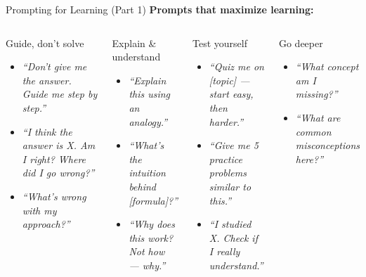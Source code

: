 \documentclass[aspectratio=169]{beamer}
\begin{document}
\begin{frame}{Prompting for Learning (Part 1)}
\small
\textbf{\color{popblue}Prompts that maximize learning:}

\smallskip
\begin{columns}[T]
\begin{block}{Guide, don't solve}
\begin{itemize}\setlength\itemsep{0em}
  \item \textit{``Don't give me the answer. Guide me step by step.''}
  \item \textit{``I think the answer is X. Am I right? Where did I go wrong?''}
  \item \textit{``What's wrong with my approach?''}
\end{itemize}
\end{block}

\smallskip
\begin{block}{Explain \& understand}
\begin{itemize}\setlength\itemsep{0em}
  \item \textit{``Explain this using an analogy.''}
  \item \textit{``What's the intuition behind [formula]?''}
  \item \textit{``Why does this work? Not how --- why.''}
\end{itemize}
\end{block}

\begin{block}{Test yourself}
\begin{itemize}\setlength\itemsep{0em}
  \item \textit{``Quiz me on [topic] --- start easy, then harder.''}
  \item \textit{``Give me 5 practice problems similar to this.''}
  \item \textit{``I studied X. Check if I really understand.''}
\end{itemize}
\end{block}

\smallskip
\begin{block}{Go deeper}
\begin{itemize}\setlength\itemsep{0em}
  \item \textit{``What concept am I missing?''}
  \item \textit{``What are common misconceptions here?''}
\end{itemize}
\end{block}
\end{columns}
\end{frame}
\end{document}

